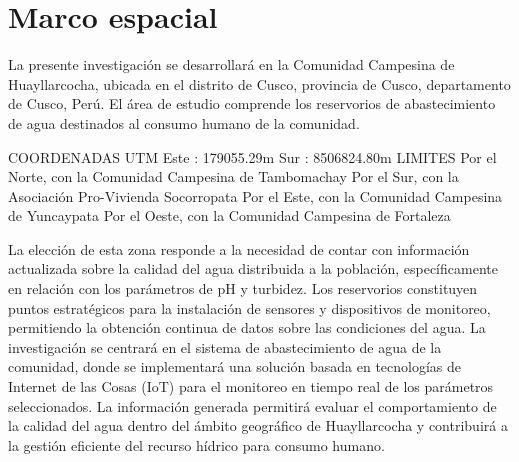 \section{Marco espacial}

La presente investigación se desarrollará en la Comunidad Campesina de Huayllarcocha, ubicada en el distrito de Cusco, provincia de Cusco, departamento de Cusco, Perú. El área de estudio comprende los reservorios de abastecimiento de agua destinados al consumo humano de la comunidad.

COORDENADAS UTM 
Este : 179055.29m Sur : 8506824.80m
LIMITES 
Por el Norte, con la Comunidad Campesina de Tambomachay 
Por el Sur, con la Asociación Pro-Vivienda Socorropata 
Por el Este, con la Comunidad Campesina de Yuncaypata 
Por el Oeste, con la Comunidad Campesina de Fortaleza

La elección de esta zona responde a la necesidad de contar con información actualizada sobre la calidad del agua distribuida a la población, específicamente en relación con los parámetros de pH y turbidez. Los reservorios constituyen puntos estratégicos para la instalación de sensores y dispositivos de monitoreo, permitiendo la obtención continua de datos sobre las condiciones del agua.
La investigación se centrará en el sistema de abastecimiento de agua de la comunidad, donde se implementará una solución basada en tecnologías de Internet de las Cosas (IoT) para el monitoreo en tiempo real de los parámetros seleccionados. La información generada permitirá evaluar el comportamiento de la calidad del agua dentro del ámbito geográfico de Huayllarcocha y contribuirá a la gestión eficiente del recurso hídrico para consumo humano.


